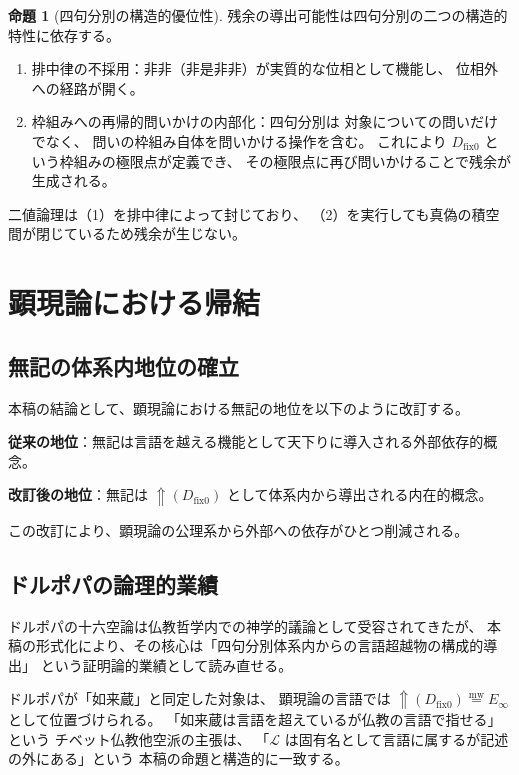 \documentclass[11pt,a4paper]{article}
\theoremstyle{definition}
\newtheorem{proposition}{命題}[section]
\newcommand{\mweq}{\mathrel{\overset{\mathrm{mw}}{=}}}
\newcommand{\dfix}{D_{\mathrm{fix}0}}
\newcommand{\Einfty}{E_\infty}
\newcommand{\metanegation}{\Uparrow}
\newcommand{\phiNS}{\text{非非}}
\begin{document}
\begin{proposition}[四句分別の構造的優位性]
残余の導出可能性は四句分別の二つの構造的特性に依存する。
\begin{enumerate}
  \item 排中律の不採用：$\phiNS$（非是非非）が実質的な位相として機能し、
        位相外への経路が開く。
  \item 枠組みへの再帰的問いかけの内部化：四句分別は
        対象についての問いだけでなく、
        問いの枠組み自体を問いかける操作を含む。
        これにより $\dfix$ という枠組みの極限点が定義でき、
        その極限点に再び問いかけることで残余が生成される。
\end{enumerate}
二値論理は（1）を排中律によって封じており、
（2）を実行しても真偽の積空間が閉じているため残余が生じない。
\end{proposition}

\section{顕現論における帰結}

\subsection{無記の体系内地位の確立}

本稿の結論として、顕現論における無記の地位を以下のように改訂する。

\textbf{従来の地位}：無記は言語を越える機能として天下りに導入される外部依存的概念。

\textbf{改訂後の地位}：無記は $\metanegation(\dfix)$ として体系内から導出される内在的概念。

この改訂により、顕現論の公理系から外部への依存がひとつ削減される。

\subsection{ドルポパの論理的業績}

ドルポパの十六空論は仏教哲学内での神学的議論として受容されてきたが、
本稿の形式化により、その核心は「四句分別体系内からの言語超越物の構成的導出」
という証明論的業績として読み直せる。

ドルポパが「如来蔵」と同定した対象は、
顕現論の言語では $\metanegation(\dfix) \mweq \Einfty$ として位置づけられる。
「如来蔵は言語を超えているが仏教の言語で指せる」という
チベット仏教他空派の主張は、
「$\mathcal{L}$ は固有名として言語に属するが記述の外にある」という
本稿の命題と構造的に一致する。
\end{document}
